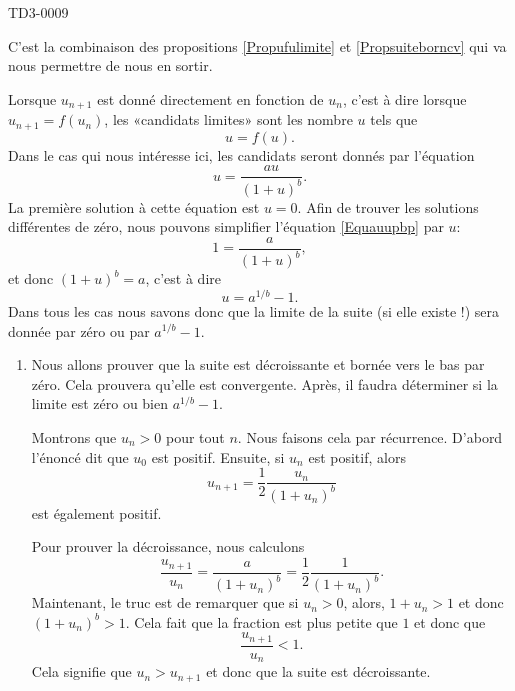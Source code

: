
\begin{corrige}{TD3-0009}

	C'est la combinaison des propositions \ref{Propufulimite} et \ref{Propsuiteborncv} qui va nous permettre de nous en sortir.

	Lorsque $u_{n+1}$ est donné directement en fonction de $u_n$, c'est à dire lorsque $u_{n+1}=f(u_n)$, les «candidats limites» sont les nombre $u$ tels que
	\begin{equation}
		u=f(u).
	\end{equation}
	Dans le cas qui nous intéresse ici, les candidats seront donnés par l'équation
	\begin{equation}		\label{Equauupbp}
		u=\frac{ au }{ (1+u)^b }.
	\end{equation}
	La première solution à cette équation est $u=0$. Afin de trouver les solutions différentes de zéro, nous pouvons simplifier l'équation \eqref{Equauupbp} par $u$:
	\begin{equation}
		1=\frac{ a }{ (1+u)^b },
	\end{equation}
	et donc $(1+u)^b=a$, c'est à dire
	\begin{equation}
		u=a^{1/b}-1.
	\end{equation}
	Dans tous les cas nous savons donc que la limite de la suite (si elle existe !) sera donnée par zéro ou par $a^{1/b}-1$.

	\begin{enumerate}
		\item
			Nous allons prouver que la suite est décroissante et bornée vers le bas par zéro. Cela prouvera qu'elle est convergente. Après, il faudra déterminer si la limite est zéro ou bien $a^{1/b}-1$.

			Montrons que $u_n>0$ pour tout $n$. Nous faisons cela par récurrence. D'abord l'énoncé dit que $u_0$ est positif. Ensuite, si $u_n$ est positif, alors
			\begin{equation}
				u_{n+1}=\frac{ 1 }{2}\frac{ u_n }{ (1+u_n)^b }
			\end{equation}
			est également positif.

			Pour prouver la décroissance, nous calculons
			\begin{equation}
				\frac{ u_{n+1} }{ u_n }=\frac{ a }{ (1+u_n)^b }=\frac{ 1 }{2}\frac{ 1 }{ (1+u_n)^b }.
			\end{equation}
			Maintenant, le truc est de remarquer que si $u_n>0$, alors, $1+u_n>1$ et donc $(1+u_n)^b>1$. Cela fait que la fraction est plus petite que $1$ et donc que
			\begin{equation}
				\frac{ u_{n+1} }{ u_n }<1.
			\end{equation}
			Cela signifie que $u_n>u_{n+1}$ et donc que la suite est décroissante.


\end{enumerate}
\end{corrige}
